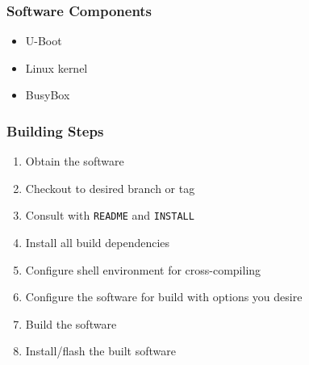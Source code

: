 \documentclass[aspectratio=169]{beamer}
\begin{document}
\begin{frame}
  \frametitle{Software Components}
  \begin{itemize}
    \item U-Boot
    \item Linux kernel
    \item BusyBox
  \end{itemize}
  \bigskip
  \begin{overlayarea}{\textwidth}{.4\textheight}
  \end{overlayarea}
\end{frame}

\begin{frame}
  \frametitle{Building Steps}
  \begin{enumerate}
    \item Obtain the software
    \item Checkout to desired branch or tag
    \item Consult with \texttt{README} and \texttt{INSTALL}
    \item Install all build dependencies
    \item Configure shell environment for cross-compiling
    \item Configure the software for build with options you desire
    \item Build the software
    \item Install/flash the built software
  \end{enumerate}
\end{frame}
\end{document}
